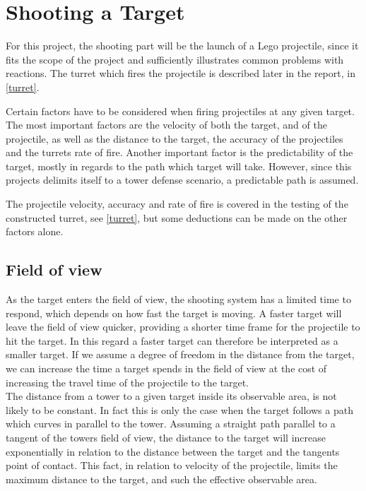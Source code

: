 \section{Shooting a Target}\label{sec:shooting}\label{\automlabel}
For this project, the shooting part will be the launch of a Lego projectile, since it fits the scope of the project and sufficiently illustrates common problems with reactions. The turret which fires the projectile is described later in the report, in \cref{turret}.

Certain factors have to be considered when firing projectiles at any given target. The most important factors are the velocity of both the target, and of the projectile, as well as the distance to the target, the accuracy of the projectiles and the turrets rate of fire. Another important factor is the predictability of the target, mostly in regards to the path which target will take. However, since this projects delimits itself to a tower defense scenario, a predictable path is assumed.

The projectile velocity, accuracy and rate of fire is covered in the testing of the constructed turret, see \cref{turret}, but some deductions can be made on the other factors alone.

\subsection{Field of view}\label{FoW}
As the target enters the field of view, the shooting system has a limited time to respond, which depends on how fast the target is moving. A faster target will leave the field of view quicker, providing a shorter time frame for the projectile to hit the target. In this regard a faster target can therefore be interpreted as a smaller target. If we assume a degree of freedom in the distance from the target, we can increase the time a target spends in the field of view at the cost of increasing the travel time of the projectile to the target.\\

The distance from a tower to a given target inside its observable area, is not likely to be constant. In fact this is only the case when the target follows a path which curves in parallel to the tower. Assuming a straight path parallel to a tangent of the towers field of view, the distance to the target will increase exponentially in relation to the distance between the target and the tangents point of contact. This fact, in relation to velocity of the projectile, limits the maximum distance to the target, and such the effective observable area. 

